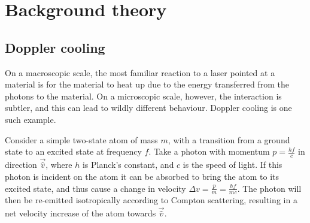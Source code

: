 \documentclass[11pt,twoside,a4paper]{article}
\begin{document}
\section{Background theory}
\subsection{Doppler cooling}
On a macroscopic scale, the most familiar reaction to a laser pointed at a material is for the material to heat up due to the energy transferred from the photons to the material. On a microscopic scale,
however, the interaction is subtler, and this can lead to wildly different behaviour. Doppler cooling is one such example.

Consider a simple two-state atom of mass \(m\), with a transition from a ground state to an excited state at frequency \(f\). Take a photon with momentum \(p=\frac{hf}{c}\) in direction \(\vec{\hat{v}}\), where \(h\) is Planck's constant, and \(c\) is the speed of light.
If this photon is incident on the atom it can be absorbed to bring the atom to
its excited state, and thus cause a change in velocity \(\Delta v=\frac{p}{m}=\frac{hf}{mc}\). The photon will then be re-emitted isotropically according to Compton scattering, resulting in a net velocity increase of the atom towards \(\vec{\hat{v}}\).
\end{document}
